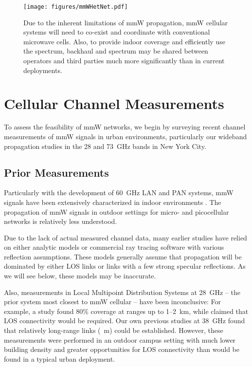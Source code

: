 \documentclass[journal]{IEEEtran}
\begin{document}
\begin{figure}
\begin{center}
    \texttt{[image: figures/mmWHetNet.pdf]}
\end{center}
\caption{Due to the inherent limitations of mmW propagation,
mmW cellular systems will need to co-exist and coordinate with
conventional microwave cells.  Also, to provide indoor coverage and
efficiently use the spectrum, backhaul and spectrum may be shared between
operators and third parties much more significantly than in current
deployments.
}
\label{fig:mmWHetNet}
\vspace{-0.1in}
\end{figure}

\section{Cellular Channel Measurements} \label{sec:chanMeas}

To assess the feasibility of mmW networks, we begin by surveying
recent channel measurements of mmW signals in urban environments,
particularly our wideband propagation studies in the
28 and 73~GHz bands in New York City.

\subsection{Prior Measurements}

Particularly with the development of 60~GHz LAN and PAN systems, mmW signals have been
extensively characterized in indoor environments
\cite{Ted:60Gstate11,Daniels:10,Zwick05,Giannetti:99,Anderson04,Smulders,Manabe,ben2011millimeter,ted2}.
The propagation of mmW signals in outdoor settings for micro- and
picocellular networks is relatively less understood.

Due to the lack of actual measured channel data,
many earlier studies \cite{KhanPi:11,ZhangMadhow1,AkoumAyaHeath:12,PietBRPC:12}
have relied on either analytic models or commercial ray tracing software
with various reflection assumptions.
These models
generally assume that propagation will be dominated by either LOS links or
links with a few strong specular reflections.  As we will see below,
these models may be inaccurate.

Also, measurements in Local Multipoint Distribution Systems at 28~GHz
-- the prior system most closest to mmW cellular --
have been inconclusive:
For example, a study \cite{ElrefShak:97} found 80\% coverage at ranges
up to 1--2~km, while \cite{SeiArn:95} claimed that LOS connectivity would be
required.  Our own previous
studies at 38~GHz \cite{Rappaport:13-BBmmW,Rappaport38:12,ted:rww12,ted:wcnc12,Rappaport-72GHz:13} found that relatively long-range
links (~m) could be established.  However, these measurements
were performed in an outdoor
campus setting with much lower building density and
greater opportunities for LOS connectivity than would be found in a typical
urban deployment.
\end{document}
